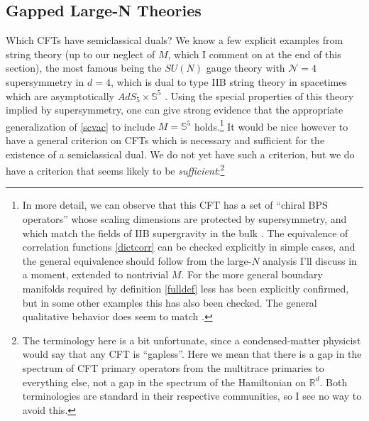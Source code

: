 \documentclass[toc]{PoS}
\begin{document}
\subsection{Gapped Large-N Theories}
Which CFTs have semiclassical duals?  We know a few explicit examples from string theory (up to our neglect of $M$, which I comment on at the end of this section), the most famous being the $SU(N)$ gauge theory with $\mathcal{N}=4$ supersymmetry in $d=4$, which is dual to type IIB string theory in spacetimes which are asymptotically $AdS_5\times \mathbb{S}^5$ \cite{Maldacena:1997re}.  Using the special properties of this theory implied by supersymmetry, one can give strong evidence that the appropriate generalization of \eqref{scvac} to include $M=\mathbb{S}^5$ holds.\footnote{In more detail, we can observe that this CFT has a set of ``chiral BPS operators'' whose scaling dimensions are protected by supersymmetry, and which match the fields of IIB supergravity in the bulk \cite{Witten:1998qj}.  The equivalence of correlation functions \eqref{dictcorr} can be checked explicitly in simple cases, and the general equivalence should follow from the large-$N$ analysis I'll discuss in a moment, extended to nontrivial $M$.  For the more general boundary manifolds required by definition \eqref{fulldef} less has been explicitly confirmed, but in some other examples this has also been checked.  The general qualitative behavior does seem to match \cite{Witten:1998qj,Witten:1998zw}.}  It would be nice however to have a general criterion on CFTs which is necessary and sufficient for the existence of a semiclassical dual.  We do not yet have such a criterion, but we do have a criterion that seems likely to be \textit{sufficient}:\footnote{The terminology here is a bit unfortunate, since a condensed-matter physicist would say that any CFT is ``gapless''.  Here we mean that there is a gap in the spectrum of CFT primary operators from the multitrace primaries to everything else, not a gap in the spectrum of the Hamiltonian on $\mathbb{R}^d$.  Both terminologies are standard in their respective communities, so I see no way to avoid this.}
\end{document}
